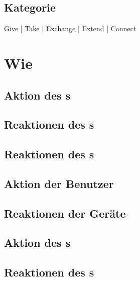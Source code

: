 \subsection*{Kategorie}
 Give   |   
 Take   |   
 Exchange   |   
 Extend   |   
 Connect

\newpage
\section*{Wie}

\ifx\reactionSen\undefined
\else
	\ifx\swapReactions\undefined
		\ifx\usersEqual\undefined	
			\subsection*{Aktion des \sen s}
			\useraction

			\subsection*{Reaktionen des \sendev s}
			\reactionSen

			\subsection*{Reaktionen des \recdev s}
			\reactionRec
		\else
			\subsection*{Aktion der Benutzer}
			\useraction

			\subsection*{Reaktionen der Geräte}
			\reactionSen
		\fi
	\else
		\subsection*{Aktion des \rec s}
		\useraction
	
		\subsection*{Reaktionen des \recdev s}
		\reactionRec
	
